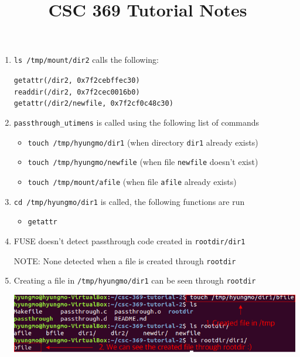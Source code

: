 \documentclass[12pt]{article}
\begin{document}
\title{CSC 369 Tutorial Notes}

\begin{enumerate}[1.]
    \item \texttt{ls /tmp/mount/dir2} calls the following:

    \bigskip

    \texttt{getattr(/dir2, 0x7f2cebffec30)}\\
    \texttt{readdir(/dir2, 0x7f2cec0016b0)}\\
    \texttt{getattr(/dir2/newfile, 0x7f2cf0c48c30)}

    \item \texttt{passthrough\_utimens} is called using the following list of commands

    \begin{itemize}
        \item \texttt{touch /tmp/hyungmo/dir1} (when directory \texttt{dir1} already exists)
        \item \texttt{touch /tmp/hyungmo/newfile} (when file \texttt{newfile} doesn't exist)
        \item \texttt{touch /tmp/mount/afile} (when file \texttt{afile} already exists)
    \end{itemize}

    \item \texttt{cd /tmp/hyungmo/dir1} is called, the following functions are run

    \begin{itemize}
        \item \texttt{getattr}
    \end{itemize}

    \item FUSE doesn't detect passthrough code created in \texttt{rootdir/dir1}

    \bigskip

    \color{red}NOTE\color{black}: None detected when a file is created through \texttt{rootdir}

    \bigskip

    \item Creating a file in \texttt{/tmp/hyungmo/dir1} can be seen through \texttt{rootdir}

    \begin{center}
    \includegraphics[width=0.8\linewidth]{images/notes_15.png}
    \end{center}


\end{enumerate}
\end{document}

